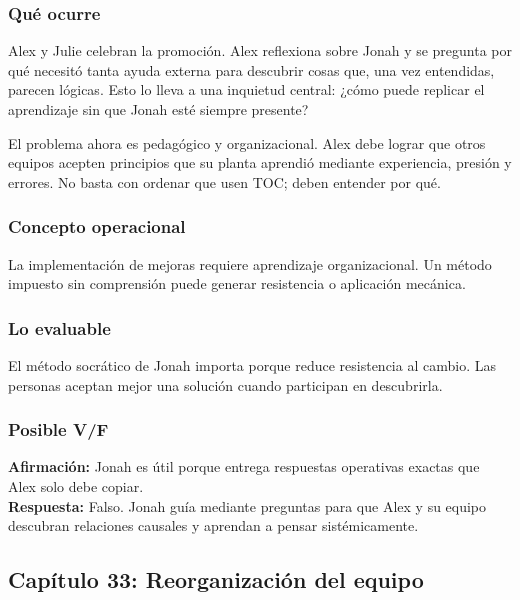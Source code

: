 \documentclass[
  11pt,
]{article}
\begin{document}
\hypertarget{quuxe9-ocurre-5}{%
\subsubsection{Qué ocurre}\label{quuxe9-ocurre-5}}

Alex y Julie celebran la promoción. Alex reflexiona sobre Jonah y se
pregunta por qué necesitó tanta ayuda externa para descubrir cosas que,
una vez entendidas, parecen lógicas. Esto lo lleva a una inquietud
central: ¿cómo puede replicar el aprendizaje sin que Jonah esté siempre
presente?

El problema ahora es pedagógico y organizacional. Alex debe lograr que
otros equipos acepten principios que su planta aprendió mediante
experiencia, presión y errores. No basta con ordenar que usen TOC; deben
entender por qué.

\hypertarget{concepto-operacional-5}{%
\subsubsection{Concepto operacional}\label{concepto-operacional-5}}

La implementación de mejoras requiere aprendizaje organizacional. Un
método impuesto sin comprensión puede generar resistencia o aplicación
mecánica.

\hypertarget{lo-evaluable-5}{%
\subsubsection{Lo evaluable}\label{lo-evaluable-5}}

El método socrático de Jonah importa porque reduce resistencia al
cambio. Las personas aceptan mejor una solución cuando participan en
descubrirla.

\hypertarget{posible-vf-5}{%
\subsubsection{Posible V/F}\label{posible-vf-5}}

\textbf{Afirmación:} Jonah es útil porque entrega respuestas operativas
exactas que Alex solo debe copiar.\\
\textbf{Respuesta:} Falso. Jonah guía mediante preguntas para que Alex y
su equipo descubran relaciones causales y aprendan a pensar
sistémicamente.

\hypertarget{capuxedtulo-33-reorganizaciuxf3n-del-equipo}{%
\subsection{Capítulo 33: Reorganización del
equipo}\label{capuxedtulo-33-reorganizaciuxf3n-del-equipo}}
\end{document}
